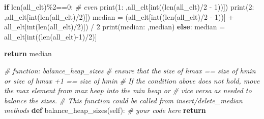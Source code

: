 \documentclass[
]{article}
\newenvironment{Shaded}{}{}
\newcommand{\BuiltInTok}[1]{\textcolor[rgb]{0.00,0.50,0.00}{#1}}
\newcommand{\CommentTok}[1]{\textcolor[rgb]{0.38,0.63,0.69}{\textit{#1}}}
\newcommand{\ControlFlowTok}[1]{\textcolor[rgb]{0.00,0.44,0.13}{\textbf{#1}}}
\newcommand{\DecValTok}[1]{\textcolor[rgb]{0.25,0.63,0.44}{#1}}
\newcommand{\KeywordTok}[1]{\textcolor[rgb]{0.00,0.44,0.13}{\textbf{#1}}}
\newcommand{\NormalTok}[1]{#1}
\newcommand{\OperatorTok}[1]{\textcolor[rgb]{0.40,0.40,0.40}{#1}}
\newcommand{\StringTok}[1]{\textcolor[rgb]{0.25,0.44,0.63}{#1}}
\newcommand{\VariableTok}[1]{\textcolor[rgb]{0.10,0.09,0.49}{#1}}
\begin{document}
\begin{Shaded}
\begin{Highlighting}[]
        \ControlFlowTok{if} \BuiltInTok{len}\NormalTok{(all\_elt)}\OperatorTok{\%}\DecValTok{2}\OperatorTok{==}\DecValTok{0}\NormalTok{: }\CommentTok{\# even}
          \BuiltInTok{print}\NormalTok{(}\StringTok{\textquotesingle{}1: \textquotesingle{}}\NormalTok{,all\_elt[}\BuiltInTok{int}\NormalTok{((}\BuiltInTok{len}\NormalTok{(all\_elt)}\OperatorTok{/}\DecValTok{2} \OperatorTok{{-}} \DecValTok{1}\NormalTok{))])}
          \BuiltInTok{print}\NormalTok{(}\StringTok{\textquotesingle{}2: \textquotesingle{}}\NormalTok{,all\_elt[}\BuiltInTok{int}\NormalTok{(}\BuiltInTok{len}\NormalTok{(all\_elt)}\OperatorTok{/}\DecValTok{2}\NormalTok{)])}
\NormalTok{          median }\OperatorTok{=}\NormalTok{ (all\_elt[}\BuiltInTok{int}\NormalTok{((}\BuiltInTok{len}\NormalTok{(all\_elt)}\OperatorTok{/}\DecValTok{2} \OperatorTok{{-}} \DecValTok{1}\NormalTok{))] }\OperatorTok{+}\NormalTok{ all\_elt[}\BuiltInTok{int}\NormalTok{(}\BuiltInTok{len}\NormalTok{(all\_elt)}\OperatorTok{/}\DecValTok{2}\NormalTok{)]) }\OperatorTok{/} \DecValTok{2}
          \BuiltInTok{print}\NormalTok{(}\StringTok{\textquotesingle{}median: \textquotesingle{}}\NormalTok{,median)}
        \ControlFlowTok{else}\NormalTok{:}
\NormalTok{          median }\OperatorTok{=}\NormalTok{ all\_elt[}\BuiltInTok{int}\NormalTok{((}\BuiltInTok{len}\NormalTok{(all\_elt)}\OperatorTok{{-}}\DecValTok{1}\NormalTok{)}\OperatorTok{/}\DecValTok{2}\NormalTok{)]}

        \ControlFlowTok{return}\NormalTok{ median}


    \CommentTok{\# function: balance\_heap\_sizes}
    \CommentTok{\# ensure that the size of hmax == size of hmin or size of hmax +1 == size of hmin}
    \CommentTok{\# If the condition above does not hold, move the max element from max heap into the min heap or}
    \CommentTok{\# vice versa as needed to balance the sizes.}
    \CommentTok{\# This function could be called from insert/delete\_median methods}
    \KeywordTok{def}\NormalTok{ balance\_heap\_sizes(}\VariableTok{self}\NormalTok{):}
        \CommentTok{\# your code here}
        \ControlFlowTok{return}



\end{Highlighting}
\end{Shaded}
\end{document}
